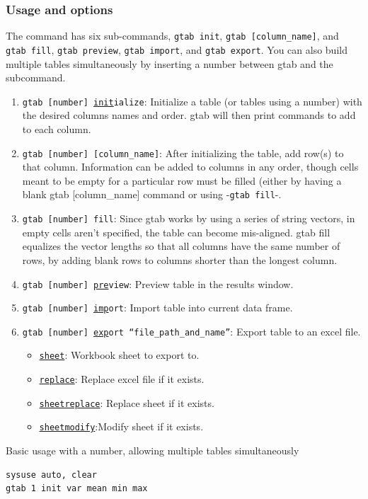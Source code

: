 {\subsubsection{Usage and options}
The command has six sub-commands, \texttt{gtab init}, \texttt{gtab [column\_name]}, and \texttt{gtab fill}, \texttt{gtab preview}, \texttt{gtab import}, and \texttt{gtab export}. You can also build multiple tables simultaneously by inserting a number between gtab and the subcommand.
\begin{enumerate}
\item \texttt{gtab [number] \underline{init}ialize}: Initialize a table (or tables using a number) with the desired columns names and order. gtab will then print commands to add to each column.
\item \texttt{gtab [number] [column\_name]}: After initializing the table, add row(s) to that column. Information can be added to columns in any order, though cells meant to be empty for a particular row must be filled (either by having a blank gtab [column\_name] command or using -\texttt{gtab fill}-.
\item \texttt{gtab [number] fill}: Since gtab works by using a series of string vectors, in empty cells aren't specified, the table can become mis-aligned. gtab fill equalizes the vector lengths so that all columns have the same number of rows, by adding blank rows to columns shorter than the longest column.
\item \texttt{gtab [number] \underline{pre}view}: Preview table in the results window.
\item \texttt{gtab [number] \underline{imp}ort}: Import table into current data frame.
\item \texttt{gtab [number] \underline{exp}ort ``file\_path\_and\_name''}: Export table to an excel file.
\begin{itemize}
\item \texttt{\underline{sheet}}: Workbook sheet to export to.
\item \texttt{\underline{replace}}: Replace excel file if it exists.
\item \texttt{\underline{sheetreplace}}: Replace sheet if it exists.
\item \texttt{\underline{sheetmodify}}:Modify sheet if it exists.
\end{itemize}

\end{enumerate}

Basic usage with a number, allowing multiple tables simultaneously
\begin{lstlisting}
sysuse auto, clear
gtab 1 init var mean min max


\end{lstlisting}}
